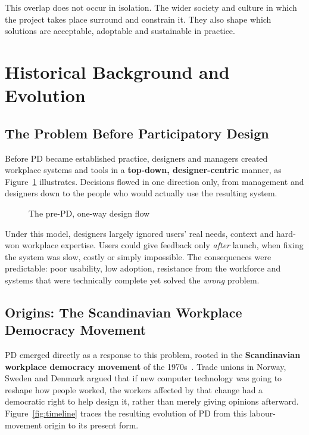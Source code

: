 \documentclass[a4paper,12pt]{article}
\begin{document}
This overlap does not occur in isolation. The wider society and culture in which the project takes place surround and constrain it. They also shape which solutions are acceptable, adoptable and sustainable in practice.

\section{Historical Background and Evolution}
\label{sec:history}

\subsection{The Problem Before Participatory Design}
Before PD became established practice, designers and managers created workplace systems and tools in a \textbf{top-down, designer-centric} manner, as Figure~\ref{fig:topdown} illustrates. Decisions flowed in one direction only, from management and designers down to the people who would actually use the resulting system.

\begin{figure}[H]
\centering
{}
\caption{The pre-PD, one-way design flow}
\label{fig:topdown}
\end{figure}

Under this model, designers largely ignored users' real needs, context and hard-won workplace expertise. Users could give feedback only \emph{after} launch, when fixing the system was slow, costly or simply impossible. The consequences were predictable: poor usability, low adoption, resistance from the workforce and systems that were technically complete yet solved the \emph{wrong} problem.

\subsection{Origins: The Scandinavian Workplace Democracy Movement}
PD emerged directly as a response to this problem, rooted in the \textbf{Scandinavian workplace democracy movement} of the 1970s~\cite{ehn1988,bansler1989}. Trade unions in Norway, Sweden and Denmark argued that if new computer technology was going to reshape how people worked, the workers affected by that change had a democratic right to help design it, rather than merely giving opinions afterward. Figure~\ref{fig:timeline} traces the resulting evolution of PD from this labour-movement origin to its present form.
\end{document}
